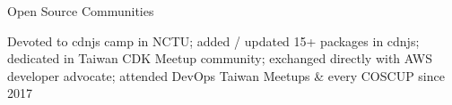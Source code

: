 \begin{cventries}
  \cventry
    {} %
    {Open Source Communities} %
    {} %
    {} %
    {
      \vspace{-2em}
      \begin{cvitems} %
        \item {Devoted to cdnjs camp in NCTU; added / updated 15+ packages in cdnjs; dedicated in Taiwan CDK Meetup community; exchanged directly with AWS developer advocate; attended DevOps Taiwan Meetups \& every COSCUP since 2017}
      \end{cvitems}
    }

\end{cventries}
